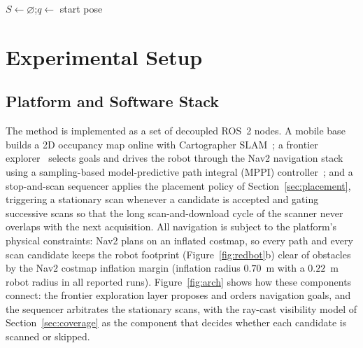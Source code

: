 \documentclass[sensors,article,submit,pdftex,moreauthors]{Definitions/mdpi}
\begin{document}
\begin{algorithm}[H]
\caption{Visibility-based stop-and-scan placement}
\label{alg:placement}
\SetAlgoLined
\DontPrintSemicolon
{}
$S \leftarrow \varnothing$;\quad $q \leftarrow$ start pose\;
\;
\end{algorithm}


\section{Experimental Setup}
\label{sec:setup}

\subsection{Platform and Software Stack}

The method is implemented as a set of decoupled ROS~2 nodes. A mobile base
builds a 2D occupancy map online with Cartographer SLAM~\cite{hess2016}; a
frontier explorer~\cite{guler2024} selects goals and drives the robot through
the Nav2 navigation stack~\cite{macenski2020} using a sampling-based
model-predictive path integral (MPPI) controller~\cite{williams2016}; and a
stop-and-scan sequencer applies the
placement policy of Section~\ref{sec:placement}, triggering a stationary scan
whenever a candidate is accepted and gating successive scans so that the long
scan-and-download cycle of the scanner never overlaps with the next acquisition.
All navigation is subject to the platform's physical constraints: Nav2 plans on
an inflated costmap, so every path and every scan candidate keeps the robot
footprint (Figure~\ref{fig:redbot}b) clear of obstacles by the Nav2 costmap
inflation margin (inflation radius $0.70$~m with a $0.22$~m robot radius in
all reported runs).
Figure~\ref{fig:arch} shows how these components connect: the frontier
exploration layer proposes and orders navigation goals, and the sequencer
arbitrates the stationary scans, with the ray-cast visibility model of
Section~\ref{sec:coverage} as the component that decides whether each candidate
is scanned or skipped.
\end{document}

